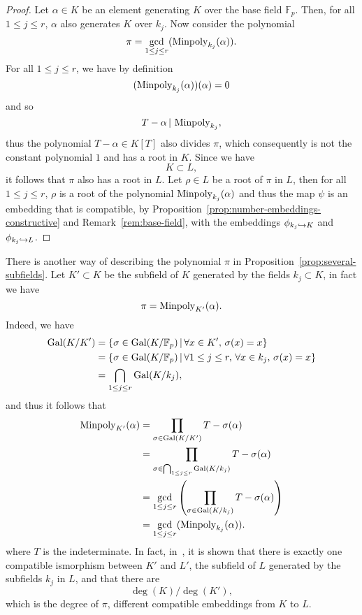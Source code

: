 \begin{proof}
  Let $\alpha\in K$ be an element generating $K$ over the base field
  $\mathbb{F}_p$. Then, for all $1\leq j\leq r$, $\alpha$ also generates $K$
  over $k_j$. Now consider the polynomial
  \[
    \pi = \gcd_{1\leq j\leq r}(\operatorname{Minpoly}_{k_j}(\alpha)).
  \]
  For all $1\leq j\leq r$, we have by definition
  \[
    (\operatorname{Minpoly}_{k_j}(\alpha))(\alpha) = 0
  \]
  and so
  \[
    T-\alpha\,|\,\operatorname{Minpoly}_{k_j},
  \]
  thus the polynomial $T-\alpha\in K[T]$ also divides $\pi$, which consequently is not the constant
  polynomial $1$ and has a root in $K$. Since we have
  \[
    K\subset L,
  \]
  it follows that $\pi$ also has a root in $L$. Let $\rho\in L$ be a root of $\pi$
  in $L$, then for all $1\leq j\leq r$, $\rho$ is a root of
  the polynomial $\operatorname{Minpoly}_{k_j}(\alpha)$ and thus the map $\psi$ is an
  embedding that is compatible, by
  Proposition~\ref{prop:number-embeddings-constructive} and
  Remark~\ref{rem:base-field}, with the embeddings
  $\phi_{k_j\hookrightarrow K}$ and $\phi_{k_j\hookrightarrow L}$.
\end{proof}
\begin{rem}
  \label{rem:greatest-common-subfield}
  There is another way of describing the polynomial $\pi$ in
  Proposition~\ref{prop:several-subfields}. Let $K'\subset K$ be the
  subfield of $K$ generated by the fields $k_j\subset K$, in fact we have
  \[
    \pi = \operatorname{Minpoly}_{K'}(\alpha).
  \]
  Indeed, we have
  \begin{align*}
    \operatorname{Gal}(K/K') &= \left\{ \sigma\in\operatorname{Gal}(K/\mathbb{F}_p)\,|\,\forall x\in
  K',\,\sigma(x) = x \right\}\\
  &= \left\{ \sigma\in\operatorname{Gal}(K/\mathbb{F}_p)\,|\,\forall 1\leq j\leq r,\,\forall x\in
  k_j,\,\sigma(x) = x \right\}\\
  &= \bigcap_{1\leq j\leq r}\operatorname{Gal}(K/k_j),
  \end{align*}
  and thus it follows that
  \begin{align*}
    \operatorname{Minpoly}_{K'}(\alpha) &= \prod_{\sigma\in\operatorname{Gal}(K/K')}T-\sigma(\alpha)\\
    &=\prod_{\sigma\in\bigcap_{1\leq j\leq r}\operatorname{Gal}(K/k_j)}T-\sigma(\alpha)\\
    &= \gcd_{1\leq j\leq
    r}\left(\prod_{\sigma\in\operatorname{Gal}(K/k_j)}T-\sigma(\alpha)\right)\\
    &= \gcd_{1\leq j\leq r}(\operatorname{Minpoly}_{k_j}(\alpha)).
  \end{align*}
  where $T$ is the indeterminate. In fact, in~\cite{BCS97}, it is shown that
  there is exactly one compatible ismorphism between $K'$ and $L'$, the subfield
  of $L$ generated by the subfields $k_j$ in $L$, and that there are
  \[
    \deg(K)/\deg(K'),
  \]
  which is the degree of $\pi$, different compatible embeddings from $K$ to $L$.
\end{rem}

